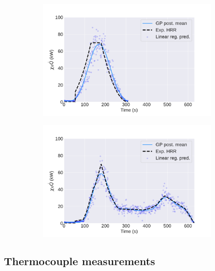 \documentclass{article}
\begin{document}
\begin{figure}[htbp]
\begin{subfigure}[t]{.45\textwidth}
      \includegraphics[width=\textwidth ,keepaspectratio]{figures/image_resultt_squared.pdf}
      \caption{}
      \label{fig:image_result_t_squared}
  \end{subfigure}
    \begin{subfigure}[t]{.45\textwidth}
      \centering
      \includegraphics[width=\textwidth ,keepaspectratio]{figures/image_resultweird_curve.pdf}
      \caption{}
      \label{fig:image_result_weird_curve}
  \end{subfigure}
  \caption{} 
  \label{fig:image_results}
\end{figure}

\subsection{Thermocouple measurements}
\end{document}
